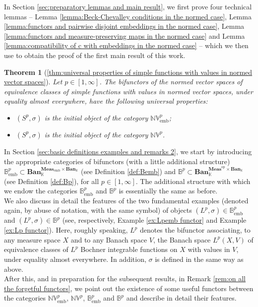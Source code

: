 \documentclass{amsart}
\theoremstyle{definition}
\theoremstyle{plain}
\newtheorem*{theorem*}{Theorem}
\newcommand{\opMeas}{\mathbf{Meas}^\mathrm{op}}
\newcommand{\embMeas}{\mathbf{Meas}_\mathrm{emb}}
\newcommand{\NVembp}{\mathbb{NV}_{\mathrm{emb}}^p}
\newcommand{\NVp}{\mathbb{NV}^p}
\newcommand{\Ban}{\mathbf{Ban}_{\mathbb{K}}}
\newcommand{\Bembp}{\mathbb{B}_{\mathrm{emb}}^p}
\newcommand{\Bp}{\mathbb{B}^p}
\begin{document}
        In Section \ref{sec:preparatory lemmas and main result}, we first prove four technical lemmas -- Lemma \ref{lemma:Beck-Chevalley conditions in the normed case}, Lemma \ref{lemma:functors and pairwise disjoint embeddings in the normed case}, Lemma \ref{lemma:functors and measure-preserving maps in the normed case} and Lemma \ref{lemma:compatibility of c with embeddings in the normed case} -- which we then use to obtain the proof of the first main result of this work.
        \begin{theorem*}[\ref{thm:universal properties of simple functions with values in normed vector spaces}]
            Let $p \in [1,\infty]$. 
            The bifunctors of the normed vector spaces of equivalence classes of simple functions with values in normed vector spaces, under equality almost everywhere, have the following universal properties:
            \begin{itemize}
                \item[(i)] $(S^p,\sigma)$ is the initial object of the category $\NVembp$;
                \item[(ii)] $(S^p,\sigma)$ is the initial object of the category $\NVp$.
            \end{itemize}
        \end{theorem*}
        In Section \ref{sec:basic definitions examples and remarks 2}, we start by introducing the appropriate categories of bifunctors (with a little additional structure) $\Bembp \subset \Ban^{\embMeas \times \Ban}$ (see Definition \ref{def:Bemb}) and $\Bp \subset \Ban^{\opMeas \times \Ban}$ (see Definition \ref{def:Bp}), for all $p \in [1,\infty]$. 
        The additional structure with which we endow the categories $\Bembp$ and $\Bp$ is essentially the same as before. \\
        We also discuss in detail the features of the two fundamental examples (denoted again, by abuse of notation, with the same symbol) of objects $(L^p,\sigma) \in \Bembp$ and $(L^p,\sigma) \in \Bp$ (see, respectively, Example \ref{ex:Lpemb functor} and Example \ref{ex:Lp functor}).
        Here, roughly speaking, $L^p$ denotes the bifunctor associating, to any measure space $X$ and to any Banach space $V$, the Banach space $L^p(X,V)$ of equivalence classes of $L^p$ Bochner integrable functions on $X$ with values in $V$, under equality almost everywhere.
        In addition, $\sigma$ is defined in the same way as above. \\
        After this, and in preparation for the subsequent results, in Remark \ref{rem:on all the forgetful functors}, we point out the existence of some useful functors between the categories $\NVembp$, $\NVp$, $\Bembp$ and $\Bp$ and describe in detail their features.
\end{document}
